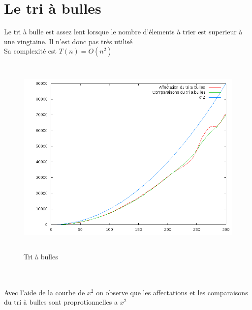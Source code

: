\documentclass[12pt,a4paper,openany]{article}
\begin{document}
	\section{Le tri à bulles}
		Le tri à bulle est assez lent lorsque le nombre d'élements à trier est superieur à une vingtaine. Il n'est donc pas très utilisé\\
		Sa complexité est $T(n) = O(n^{2})$
		\begin{figure}[!h] 
			\begin{center}	
				\includegraphics[height=10cm]{triBulles.png}										
				\caption{Tri à bulles}
			\end{center}
		\end{figure}
		\\ \\
			Avec l'aide de la courbe de $x^{2}$ on observe que les affectations et les comparaisons du tri à bulles sont proprotionnelles a $x^{2}$
		\newpage
\end{document}
